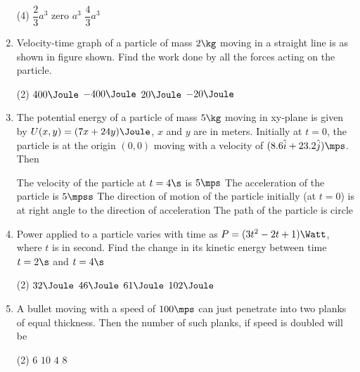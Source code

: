 \documentclass{article}
\renewcommand{\ans}{\quad}
\begin{document}
\begin{enumerate}
        \begin{tasks}(4)
            \task $\dfrac{2}{3}a^3$
            \task zero \ans
            \task $a^3$
            \task $\dfrac{4}{3}a^3$
        \end{tasks}


    \item Velocity-time graph of a particle of mass $2 \kg$ moving in a straight line is as shown in figure shown. Find the work done by all the forces acting on the particle.
        \begin{center}
        \end{center}
        \begin{tasks}(2)
            \task $400\Joule$
            \task $-400\Joule$\ans
            \task $20\Joule$
            \task $-20\Joule$
        \end{tasks}


    \item The potential energy of a particle of mass $5\kg$ moving in xy-plane is given by $U(x, y) = (7x + 24y)\Joule$, $x$ and $y$ are in meters. Initially at $t=0$, the particle is at the origin $(0, 0)$ moving with a velocity of $(8.6\hat{i}+23.2\hat{j})\mps$. Then 
        \begin{tasks}
            \task The velocity of the particle at $t=4\s$ is $5\mps$\ans
            \task The acceleration of the particle is $5\mpss$\ans
            \task The direction of motion of the particle initially (at $t=0$) is at right angle to the direction of acceleration
            \task The path of the particle is circle
        \end{tasks}

    \item Power applied to a particle varies with time as $P = (3t^2 - 2t + 1) \Watt$, where $t$ is in second. Find the change in its kinetic energy between time $t = 2 \s$ and $t = 4 \s$
        \begin{tasks}(2)
            \task $32\Joule$
            \task $46\Joule$\ans
            \task $61\Joule$
            \task $102\Joule$
        \end{tasks}

    \item A bullet moving with a speed of $100 \mps$ can just penetrate into two planks of equal thickness. Then the number of such planks, if speed is doubled will be
        \begin{tasks}(2)
            \task $6$
            \task $10$
            \task $4$
            \task $8$\ans
        \end{tasks}



\end{enumerate}
\end{document}
